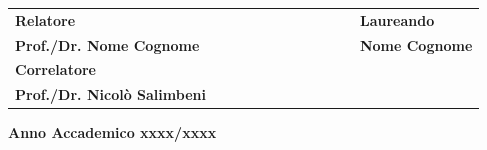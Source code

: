 \documentclass[a4paper,11pt]{book}
\begin{document}
\begin{titlepage}
\vspace{20mm}
\begin{spacing}{2}
\begin{tabular}{ l  c  c c c  cc c c c c  l }
{\Large{\bf Relatore}} &&&&&&&&&&& {\Large{\bf Laureando}}\\
{\Large{\bf Prof./Dr. Nome Cognome}} &&&&&&&&&&& {\Large{\bf Nome Cognome}}\\
{\Large{\bf Correlatore}}\\
{\Large{\bf Prof./Dr. Nicolò Salimbeni}}\\
\end{tabular}
\end{spacing}
\vspace{15 mm}

\begin{center}
{\Large{\bf Anno Accademico xxxx/xxxx}}
\end{center}
\end{titlepage}
\clearpage{\pagestyle{empty}\cleardoublepage}
\tableofcontents






\end{document}

